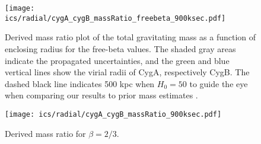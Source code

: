 \documentclass[MScProj_TLRH_ClusterEnergy.tex]{subfiles}
\begin{document}
\begin{figure}[p]
    \centering
    \texttt{[image: ics/radial/cygA\_cygB\_massRatio\_freebeta\_900ksec.pdf]}
    \caption{Derived mass ratio plot of the total gravitating mass as a function 
             of enclosing radius for the free-beta values. The shaded gray areas
             indicate the propagated uncertainties, and the green and blue vertical 
             lines show the virial radii of CygA, respectively CygB. The dashed 
             black line indicates 500 kpc when $H_0=50$ to guide the eye when comparing 
             our results to prior mass estimates \citep{2005AJ....130...47L}.
             }
    \label{fig:massRatio_feebeta}
    \texttt{[image: ics/radial/cygA\_cygB\_massRatio\_900ksec.pdf]}
    \caption{Derived mass ratio for $\beta = 2/3$.}
    \label{fig:massRatio_feebeta}
\end{figure}





\end{document}
